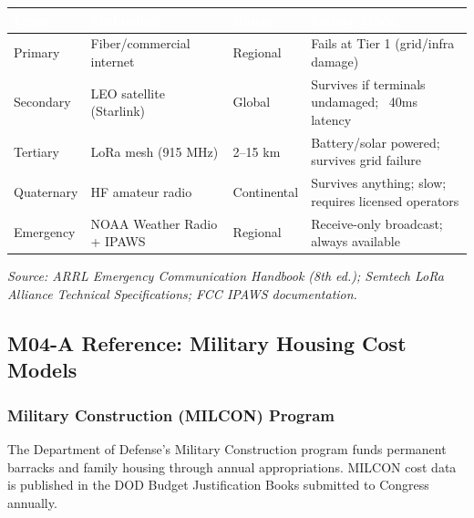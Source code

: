 \documentclass[11pt,letterpaper]{article}
\newcommand{\tableheader}[1]{\textbf{\sffamily\textcolor{white}{#1}}}
\begin{document}
\begin{center}
\begin{tabularx}{\textwidth}{L{2.5cm}L{3cm}C{2cm}X}
\toprule
{}
\tableheader{Layer} & \tableheader{Technology} & \tableheader{Range} & \tableheader{Failure Mode} \\
\midrule
Primary & Fiber/commercial internet & Regional & Fails at Tier 1 (grid/infra damage) \\
Secondary & LEO satellite (Starlink) & Global & Survives if terminals undamaged; ~40ms latency \\
Tertiary & LoRa mesh (915 MHz) & 2--15 km & Battery/solar powered; survives grid failure \\
Quaternary & HF amateur radio & Continental & Survives anything; slow; requires licensed operators \\
Emergency & NOAA Weather Radio + IPAWS & Regional & Receive-only broadcast; always available \\
\bottomrule
\end{tabularx}
\end{center}

\textit{Source: ARRL Emergency Communication Handbook (8th ed.); Semtech LoRa Alliance Technical Specifications; FCC IPAWS documentation.}

\subsection{M04-A Reference: Military Housing Cost Models}

\subsubsection{Military Construction (MILCON) Program}

The Department of Defense's Military Construction program funds permanent barracks and family housing through annual appropriations. MILCON cost data is published in the DOD Budget Justification Books submitted to Congress annually.
\end{document}
